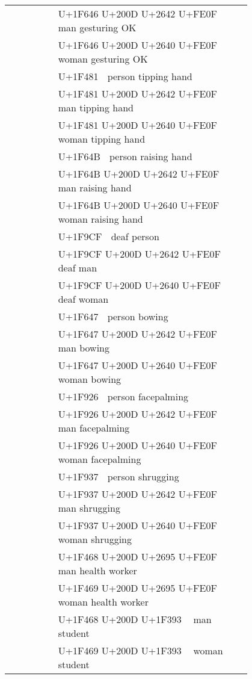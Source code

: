 \documentclass[a4paper,12pt]{article}
\newcommand{\fontA}[1]{{\fontspec[RawFeature={mode=harf,+dist,+ccmp}]{Segoe UI Emoji} #1}}
\newcommand{\fontB}[1]{{\fontspec[RawFeature={mode=harf,+dist,+ccmp}]{Noto Color Emoji} #1}}
\begin{document}
\begin{longtable}[c]{ccp{0.8\linewidth}}
\fontA{🙆‍♂️}&\fontB{🙆‍♂️}&U+1F646 U+200D U+2642 U+FE0F 🙆‍♂️ man gesturing OK\\
\fontA{🙆‍♀️}&\fontB{🙆‍♀️}&U+1F646 U+200D U+2640 U+FE0F 🙆‍♀️ woman gesturing OK\\
\fontA{💁}&\fontB{💁}&U+1F481 💁 person tipping hand\\
\fontA{💁‍♂️}&\fontB{💁‍♂️}&U+1F481 U+200D U+2642 U+FE0F 💁‍♂️ man tipping hand\\
\fontA{💁‍♀️}&\fontB{💁‍♀️}&U+1F481 U+200D U+2640 U+FE0F 💁‍♀️ woman tipping hand\\
\fontA{🙋}&\fontB{🙋}&U+1F64B 🙋 person raising hand\\
\fontA{🙋‍♂️}&\fontB{🙋‍♂️}&U+1F64B U+200D U+2642 U+FE0F 🙋‍♂️ man raising hand\\
\fontA{🙋‍♀️}&\fontB{🙋‍♀️}&U+1F64B U+200D U+2640 U+FE0F 🙋‍♀️ woman raising hand\\
\fontA{🧏}&\fontB{🧏}&U+1F9CF 🧏 deaf person\\
\fontA{🧏‍♂️}&\fontB{🧏‍♂️}&U+1F9CF U+200D U+2642 U+FE0F 🧏‍♂️ deaf man\\
\fontA{🧏‍♀️}&\fontB{🧏‍♀️}&U+1F9CF U+200D U+2640 U+FE0F 🧏‍♀️ deaf woman\\
\fontA{🙇}&\fontB{🙇}&U+1F647 🙇 person bowing\\
\fontA{🙇‍♂️}&\fontB{🙇‍♂️}&U+1F647 U+200D U+2642 U+FE0F 🙇‍♂️ man bowing\\
\fontA{🙇‍♀️}&\fontB{🙇‍♀️}&U+1F647 U+200D U+2640 U+FE0F 🙇‍♀️ woman bowing\\
\fontA{🤦}&\fontB{🤦}&U+1F926 🤦 person facepalming\\
\fontA{🤦‍♂️}&\fontB{🤦‍♂️}&U+1F926 U+200D U+2642 U+FE0F 🤦‍♂️ man facepalming\\
\fontA{🤦‍♀️}&\fontB{🤦‍♀️}&U+1F926 U+200D U+2640 U+FE0F 🤦‍♀️ woman facepalming\\
\fontA{🤷}&\fontB{🤷}&U+1F937 🤷 person shrugging\\
\fontA{🤷‍♂️}&\fontB{🤷‍♂️}&U+1F937 U+200D U+2642 U+FE0F 🤷‍♂️ man shrugging\\
\fontA{🤷‍♀️}&\fontB{🤷‍♀️}&U+1F937 U+200D U+2640 U+FE0F 🤷‍♀️ woman shrugging\\
\fontA{👨‍⚕️}&\fontB{👨‍⚕️}&U+1F468 U+200D U+2695 U+FE0F 👨‍⚕️ man health worker\\
\fontA{👩‍⚕️}&\fontB{👩‍⚕️}&U+1F469 U+200D U+2695 U+FE0F 👩‍⚕️ woman health worker\\
\fontA{👨‍🎓}&\fontB{👨‍🎓}&U+1F468 U+200D U+1F393 👨‍🎓 man student\\
\fontA{👩‍🎓}&\fontB{👩‍🎓}&U+1F469 U+200D U+1F393 👩‍🎓 woman student\\

\end{longtable}
\end{document}
